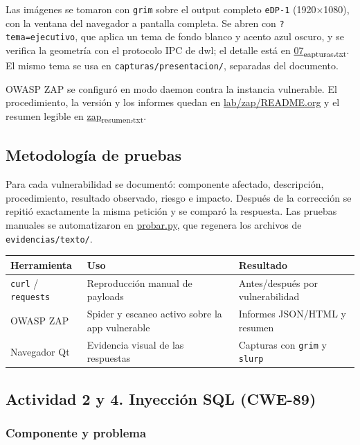 \documentclass[letterpaper]{article}
\begin{document}
Las imágenes se tomaron con \texttt{grim} sobre el output completo \texttt{eDP-1} (1920×1080),
con la ventana del navegador a pantalla completa. Se abren con
\texttt{?tema=ejecutivo}, que aplica un tema de fondo blanco y acento azul oscuro, y se
verifica la geometría con el protocolo IPC de dwl; el detalle está en
\href{evidencias/texto/07\_capturas.txt}{07\textsubscript{capturas.txt}}. El mismo tema se usa en
\texttt{capturas/presentacion/}, separadas del documento.

OWASP ZAP se configuró en modo daemon contra la instancia vulnerable. El procedimiento,
la versión y los informes quedan en \href{lab/zap/README.org}{lab/zap/README.org} y el resumen
legible en \href{evidencias/zap/zap\_resumen.txt}{zap\textsubscript{resumen.txt}}.
\subsection{Metodología de pruebas}
\label{sec:org55623a7}

Para cada vulnerabilidad se documentó: componente afectado, descripción, procedimiento,
resultado observado, riesgo e impacto. Después de la corrección se repitió exactamente
la misma petición y se comparó la respuesta. Las pruebas manuales se automatizaron en
\href{lab/pruebas/probar.py}{probar.py}, que regenera los archivos de \texttt{evidencias/texto/}.

\begin{center}
\begin{tabular}{lll}
Herramienta & Uso & Resultado\\
\hline
\texttt{curl} / \texttt{requests} & Reproducción manual de payloads & Antes/después por vulnerabilidad\\
OWASP ZAP & Spider y escaneo activo sobre la app vulnerable & Informes JSON/HTML y resumen\\
Navegador Qt & Evidencia visual de las respuestas & Capturas con \texttt{grim} y \texttt{slurp}\\
\end{tabular}
\end{center}
\subsection{Actividad 2 y 4. Inyección SQL (CWE-89)}
\label{sec:orga062268}

\subsubsection{Componente y problema}
\label{sec:orgd834499}
\end{document}
